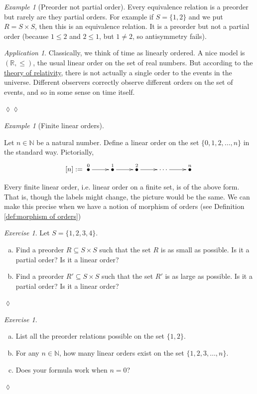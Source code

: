 \documentclass{book}
\def\RR{{\mathbb R}}
\def\NN{{\mathbb N}}
\def\ss{\subseteq}
\newcommand{\LMO}[1]{\stackrel{#1}{\bullet}}
\theoremstyle{remark}
\newtheorem{example}[subsubsection]{Example}
\newtheorem{exc}[subsubsection]{Exercise}
\newenvironment{exercise}{\begin{exc}}{\hspace*{\fill}$\lozenge$\end{exc}}
\newtheorem{app}[subsubsection]{Application}
\newenvironment{application}{\begin{app}}{\hspace*{\fill}$\lozenge\lozenge$\end{app}}
\theoremstyle{definition}
\def\sexc{\begin{enumerate}[a.)]\setlength{\itemsep}{.1cm}\setlength{\parskip}{.1cm}\item}
\def\next{\item}
\def\endsexc{\end{enumerate}}
\begin{document}
\begin{example}[Preorder not partial order]

Every equivalence relation is a preorder but rarely are they partial orders. For example if $S=\{1,2\}$ and we put $R=S\times S$, then this is an equivalence relation. It is a preorder but not a partial order (because $1\leq 2$ and $2\leq 1$, but $1\neq 2$, so antisymmetry fails).

\end{example}

\begin{application}

Classically, we think of time as linearly ordered. A nice model is $(\RR,\leq)$, the usual linear order on the set of real numbers. But according to the \href{http://en.wikipedia.org/wiki/Relativity_of_simultaneity}{\text theory of relativity}, there is not actually a single order to the events in the universe. Different observers correctly observe different orders on the set of events, and so in some sense on time itself. 

\end{application}

\begin{example}[Finite linear orders]\label{ex:finite lo}

Let $n\in\NN$ be a natural number. Define a linear order on the set $\{0,1,2,\ldots,n\}$ in the standard way. Pictorially, 
$$
[n]:=\xymatrix{\LMO{0}\ar[r]&\LMO{1}\ar[r]&\LMO{2}\ar[r]&\cdots\ar[r]&\LMO{n}}
$$

Every finite linear order, i.e. linear order on a finite set, is of the above form. That is, though the labels might change, the picture would be the same. We can make this precise when we have a notion of morphism of orders (see Definition \ref{def:morphism of orders})

\end{example}

\begin{exercise}
Let $S=\{1,2,3,4\}$. 
\sexc Find a preorder $R\ss S\times S$ such that the set $R$ is as small as possible. Is it a partial order? Is it a linear order?
\next Find a preorder $R'\ss S\times S$ such that the set $R'$ is as large as possible. Is it a partial order? Is it a linear order?
\endsexc
\end{exercise}

\begin{exercise}~
\sexc List all the preorder relations possible on the set $\{1,2\}$.
\next For any $n\in\NN$, how many linear orders exist on the set $\{1,2,3,\ldots,n\}$. 
\next Does your formula work when $n=0$?
\endsexc
\end{exercise}
\end{document}
